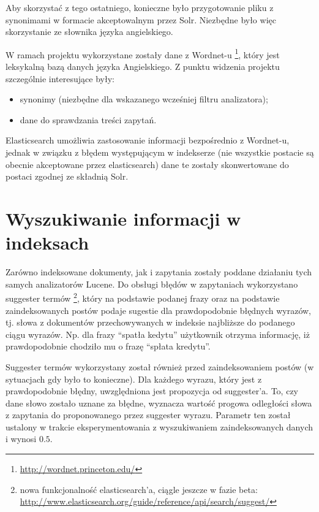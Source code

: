 \documentclass[runningheads]{llncs}
\begin{document}
Aby skorzystać z tego ostatniego, konieczne było przygotowanie pliku z
synonimami w formacie akceptowalnym przez Solr. Niezbędne było więc
skorzystanie ze słownika języka angielskiego.

W ramach projektu wykorzystane zostały dane z Wordnet-u
\footnote{\url{http://wordnet.princeton.edu/}}, który jest leksykalną
bazą danych języka Angielskiego. Z punktu widzenia projektu
szczególnie interesujące były:
\begin{itemize}
\item synonimy (niezbędne dla wskazanego wcześniej filtru analizatora);
\item dane do sprawdzania treści zapytań.
\end{itemize}

Elasticsearch umożliwia zastosowanie informacji bezpośrednio  
z Wordnet-u, jednak w związku z błędem występującym w indekserze (nie wszystkie postacie są 
obecnie akceptowane przez elasticsearch) dane te zostały skonwertowane do postaci zgodnej ze składnią
Solr.

\section{Wyszukiwanie informacji w indeksach}
\label{sec:wyszukiwanie-informacji-w-indeksach}
Zarówno indeksowane dokumenty, jak i zapytania zostały poddane działaniu tych
samych analizatorów Lucene.
Do obsługi błędów w zapytaniach wykorzystano suggester termów \footnote{nowa
funkcjonalność elasticsearch’a, ciągle jeszcze w fazie beta:
\url{http://www.elasticsearch.org/guide/reference/api/search/suggest/}}, który
na podstawie podanej frazy oraz na podstawie zaindeksowanych postów podaje
sugestie dla prawdopodobnie błędnych wyrazów, tj. słowa z dokumentów
przechowywanych w indeksie najbliższe do podanego ciągu wyrazów. Np. dla frazy
“spatła kedytu” użytkownik otrzyma informację, iż prawdopodobnie chodziło mu o
frazę “spłata kredytu”.

Suggester termów wykorzystany został również przed zaindeksowaniem postów (w
sytuacjach gdy było to konieczne).
Dla każdego wyrazu, który jest z prawdopodobnie błędny, uwzględniona jest
propozycja od suggester’a. To, czy dane słowo zostało uznane za błędne,
wyznacza wartość progowa odległości słowa z zapytania do  proponowanego przez
suggester wyrazu. Parametr ten został ustalony  w trakcie eksperymentowania z
wyszukiwaniem zaindeksowanych danych i wynosi $0.5$. 

\end{document}

